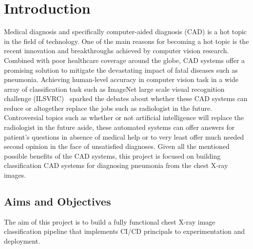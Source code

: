 \chapter{Introduction} \label{chap:introduction}

Medical diagnosis and specifically computer-aided diagnosis (CAD) is a hot topic in the field of technology. One of the main reasons for becoming a hot topic is the recent innovation and breakthroughs achieved by computer vision research. Combined with poor healthcare coverage around the globe, CAD systems offer a promising solution to mitigate the devastating impact of fatal diseases such as pneumonia. Achieving human-level accuracy in computer vision task in a wide array of classification task such as ImageNet large scale visual recognition challenge (ILSVRC)~\cite{imagenet} sparked the debates about whether these CAD systems can reduce or altogether replace the jobs such as radiologist in the future.
Controversial topics such as whether or not artificial intelligence will replace the radiologist in the future aside, these automated systems can offer answers for patient's questions in absence of medical help or to very least offer much needed second opinion in the face of unsatisfied diagnoses. Given all the mentioned possible benefits of the CAD systems, this project is focused on building classification CAD systems for diagnosing pneumonia from the chest X-ray images.

\section{Aims and Objectives} \label{sec:aimsandobj}
The aim of this project is to build a fully functional chest X-ray image classification pipeline that implements CI/CD principals to experimentation and deployment.

